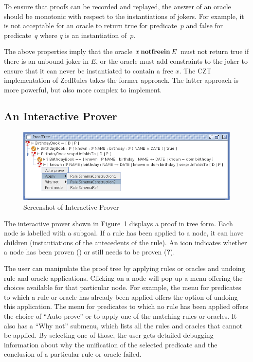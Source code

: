 \documentclass{entcs}
\begin{document}
To ensure that proofs can be recorded and replayed, the answer of an
oracle should be monotonic with respect to the instantiations of
jokers.  For example, it is not acceptable for an oracle to return
true for predicate~$p$ and false for predicate~$q$ where $q$ is an
instantiation of~$p$.

The above properties imply that the oracle $x \mathbin{\mathop{\mathstrut{\mbox{\textbf{notfreein}}}}\nolimits} E$ must not
return true if there is an unbound joker in $E$, or the oracle must
add constraints to the joker to ensure that it can never be
instantiated to contain a free $x$.  The CZT implementation of
ZedRules takes the former approach.  The latter approach is more
powerful, but also more complex to implement.


\subsection{An Interactive Prover}

\begin{figure}[htbp]
  \centering
  \includegraphics[width=\textwidth]{cztprover1}
  \caption{Screenshot of Interactive Prover}
  \label{fig:cztprover}
\end{figure}

The interactive prover shown in Figure~\ref{fig:cztprover} displays a
proof in tree form.  Each node is labelled with a subgoal.  If a rule
has been applied to a node, it can have children (instantiations of
the antecedents of the rule).  An icon indicates whether a node has
been proven () or still needs to be proven ({\bf ?}).

The user can manipulate the proof tree by applying rules or oracles
and undoing rule and oracle applications.  Clicking on a node will pop
up a menu offering the choices available for that particular node.
For example, the menu for predicates to which a rule or oracle has
already been applied offers the option of undoing this application.
The menu for predicates to which no rule has been applied offers the
choice of ``Auto prove'' or to apply one of the matching rules or
oracles.  It also has a ``Why not'' submenu, which lists all the rules
and oracles that cannot be applied.  By selecting one of those, the
user gets detailed debugging information about why the unification of
the selected predicate and the conclusion of a particular rule or
oracle failed.
\end{document}
